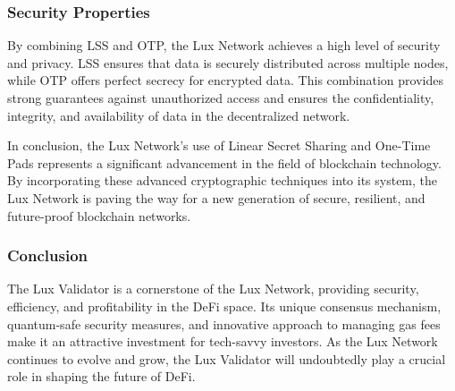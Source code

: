 \documentclass[11pt]{article}
\begin{document}
\subsubsection{Security Properties}

By combining LSS and OTP, the Lux Network achieves a high level of security and privacy. LSS ensures that data is securely distributed across multiple nodes, while OTP offers perfect secrecy for encrypted data. This combination provides strong guarantees against unauthorized access and ensures the confidentiality, integrity, and availability of data in the decentralized network.


In conclusion, the Lux Network's use of Linear Secret Sharing and One-Time Pads represents a significant advancement in the field of blockchain technology. By incorporating these advanced cryptographic techniques into its system, the Lux Network is paving the way for a new generation of secure, resilient, and future-proof blockchain networks.


\subsubsection{Conclusion}

The Lux Validator is a cornerstone of the Lux Network, providing security, efficiency, and profitability in the DeFi space. Its unique consensus mechanism, quantum-safe security measures, and innovative approach to managing gas fees make it an attractive investment for tech-savvy investors. As the Lux Network continues to evolve and grow, the Lux Validator will undoubtedly play a crucial role in shaping the future of DeFi.
\end{document}
